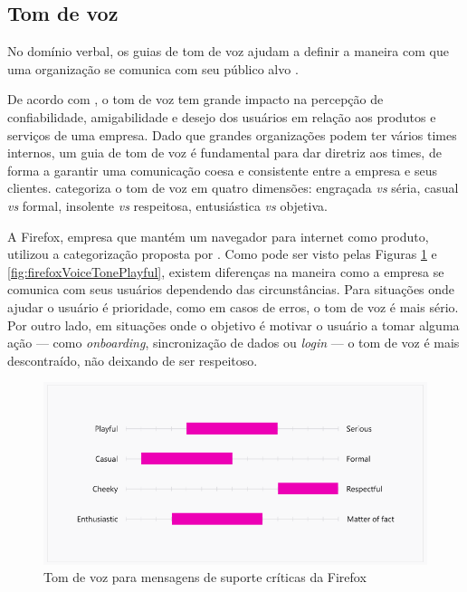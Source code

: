 \subsection{Tom de voz}
\label{subsec:tomVoz}

No domínio verbal, os guias de tom de voz ajudam a definir a maneira com que uma organização se comunica com seu público alvo \cite{ruissalo2018operating}.

De acordo com , o tom de voz tem grande impacto na percepção de confiabilidade, amigabilidade e desejo dos usuários em relação aos produtos e serviços de uma empresa. Dado que grandes organizações podem ter vários times internos, um guia de tom de voz é fundamental para dar diretriz aos times, de forma a garantir uma comunicação coesa e consistente entre a empresa e seus clientes.  categoriza o tom de voz em quatro dimensões: engraçada \textit{vs} séria, casual \textit{vs} formal, insolente \textit{vs} respeitosa, entusiástica \textit{vs} objetiva.

A Firefox, empresa que mantém um navegador para internet como produto, utilizou a categorização proposta por \cite{impactOfVoiceTone}. Como pode ser visto pelas Figuras \ref{fig:firefoxVoiceToneSerious} e \ref{fig:firefoxVoiceTonePlayful}, existem diferenças na maneira como a empresa se comunica com seus usuários dependendo das circunstâncias. Para situações onde ajudar o usuário é prioridade, como em casos de erros, o tom de voz é mais sério. Por outro lado, em situações onde o objetivo é motivar o usuário a tomar alguma ação --- como \textit{onboarding}, sincronização de dados ou \textit{login} --- o tom de voz é mais descontraído, não deixando de ser respeitoso.

\begin{figure}
	\includegraphics[width=\linewidth]{./04-figuras/02_referencial_teorico/firefox-tone-voice-01.png}
	\caption{Tom de voz para mensagens de suporte críticas da Firefox}
  \label{fig:firefoxVoiceToneSerious}
\end{figure}

